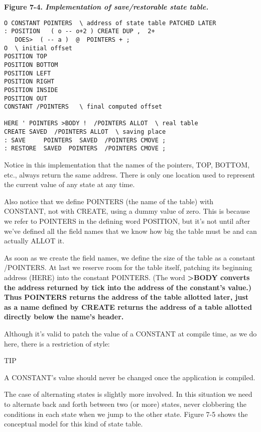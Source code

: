 \bf{Figure 7-4.} \emph{Implementation of save/restorable state table.}

\begin{verbatim}
O CONSTANT POINTERS  \ address of state table PATCHED LATER
: POSITION   ( o -- o+2 ) CREATE DUP ,  2+
   DOES>  ( -- a )  @  POINTERS + ;
O  \ initial offset
POSITION TOP
POSITION BOTTOM
POSITION LEFT
POSITION RIGHT
POSITION INSIDE
POSITION OUT
CONSTANT /POINTERS   \ final computed offset

HERE ' POINTERS >BODY !  /POINTERS ALLOT  \ real table
CREATE SAVED  /POINTERS ALLOT  \ saving place
: SAVE     POINTERS  SAVED  /POINTERS CMOVE ;
: RESTORE  SAVED  POINTERS  /POINTERS CMOVE ;
\end{verbatim}

Notice in this implementation that the names of the pointers, TOP,
BOTTOM, etc., always return the same address. There is only one location
used to represent the current value of any state at any time.

Also notice that we define POINTERS (the name of the table) with
CONSTANT, not with CREATE, using a dummy value of zero. This is
because we refer to POINTERS in the defining word POSITION, but it's
not until after we've defined all the field names that we know how big the
table must be and can actually ALLOT it.

As soon as we create the field names, we define the size of the table
as a constant /POINTERS. At last we reserve room for the table itself,
patching its beginning address (HERE) into the constant POINTERS.
(The word \bf{>BODY} converts the address returned by tick into the
address of the constant's value.) Thus POINTERS returns the address of
the table allotted later, just as a name defined by CREATE returns the
address of a table allotted directly below the name's header.

Although it's valid to patch the value of a CONSTANT at compile
time, as we do here, there is a restriction of style:

TIP

A CONSTANT's value should never be changed once the application is
compiled.

The case of alternating states is slightly more involved. In this situation
we need to alternate back and forth between two (or more) states, never
clobbering the conditions in each state when we jump to the other state.
Figure 7-5 shows the conceptual model for this kind of state table.

